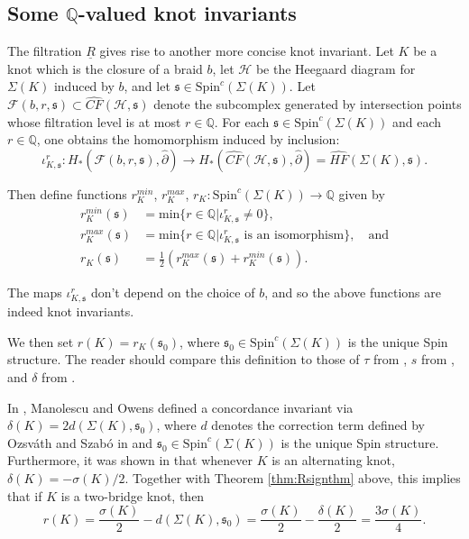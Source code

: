 \documentclass[11pt]{article}
\theoremstyle{plain} \newtheorem{thm}{Theorem}[subsection]
\theoremstyle{plain} \newtheorem{cor}[thm]{Corollary}
\theoremstyle{plain} \newtheorem{prop}[thm]{Proposition}
\theoremstyle{plain} \newtheorem{conj}[thm]{Conjecture}
\theoremstyle{plain} \newtheorem{lem}[thm]{Lemma}
\theoremstyle{definition} \newtheorem{df}[thm]{Definition}
\theoremstyle{remark} \newtheorem{rmk}[thm]{Remark}
\theoremstyle{remark} \newtheorem{obs}[thm]{Observation}
\newcommand{\DBC}[1]{\Sigma(#1)}
\newcommand{\h}{\mathcal{H}}
\newcommand{\del}{\partial}
\newcommand{\red}[1]{\underline{#1}}
\newcommand{\OS}{Ozsv\'ath and Szab\'o }
\numberwithin{equation}{section}
\begin{document}
\subsection{Some $\mathbb{Q}$-valued knot invariants}\label{sec:r}

The filtration $\red{R}$ gives rise to another more concise knot invariant.  Let $K$ be a knot which is the closure of a braid $b$, let $\h$ be the Heegaard diagram for $\DBC{K}$ induced by $b$, and let $\mathfrak{s} \in \text{Spin}^{c}(\DBC{K})$.  Let $\mathcal{F}(b,r, \mathfrak{s}) \subset \widehat{CF}(\h, \mathfrak{s})$ denote the subcomplex generated by intersection points whose filtration level is at most $r \in \mathbb{Q}$.  For each $\mathfrak{s} \in \text{Spin}^{c}(\DBC{K})$ and each $r \in \mathbb{Q}$, one obtains the homomorphism induced by inclusion:
$$ \iota^{r}_{K,\mathfrak{s}}: H_{*}(\mathcal{F}(b,r,\mathfrak{s}), \widehat{\del}) \rightarrow H_{*}(\widehat{CF}(\h, \mathfrak{s}), \widehat{\del}) = \widehat{HF}(\DBC{K},\mathfrak{s}).$$

Then define functions $r^{min}_{K}$, $r^{max}_{K}$, $r_{K}:\text{Spin}^{c}(\DBC{K}) \rightarrow \mathbb{Q}$ given by
\begin{align*}
r^{min}_{K}(\mathfrak{s}) &= \text{min}\{ r \in \mathbb{Q} |  \iota^{r}_{K,\mathfrak{s}}\neq 0\},\\
r^{max}_{K}(\mathfrak{s}) &= \text{min}\{ r \in \mathbb{Q} |  \iota^{r}_{K,\mathfrak{s}} \text{ is an isomorphism} \},
\quad \text{and}\\
r_{K}(\mathfrak{s}) &= \frac{1}{2}\left( r^{max}_{K}(\mathfrak{s}) + r^{min}_{K}(\mathfrak{s})\right).
\end{align*}

The maps $\iota^{r}_{K,\mathfrak{s}}$ don't depend on the choice of $b$, and so the above functions are indeed knot invariants.

We then set $r(K) = r_{K}(\mathfrak{s}_{0})$, where $\mathfrak{s}_{0} \in \text{Spin}^{c}(\DBC{K})$ is the unique Spin structure.  The reader should compare this definition to those of $\tau$ from \cite{os:4ball}, $s$ from \cite{ras:slice}, and $\delta$ from \cite{cmo:delta}.

In \cite{cmo:delta}, Manolescu and Owens defined a concordance invariant via $\delta(K) = 2 d(\DBC{K}, \mathfrak{s}_{0})$, where $d$ denotes the correction term defined by \OS in \cite{os:abs} and $\mathfrak{s}_{0} \in \text{Spin}^{c}(\DBC{K})$ is the unique Spin structure.  Furthermore, it was shown in \cite{cmo:delta} that whenever $K$ is an alternating knot, $\delta(K) = -\sigma(K)/2.$  Together with Theorem \ref{thm:Rsignthm} above, this implies that if $K$ is a two-bridge knot, then
$$ r(K)= \frac{\sigma(K)}{2} - d(\DBC{K}, \mathfrak{s}_{0}) = \frac{\sigma(K)}{2} - \frac{\delta(K)}{2} = \frac{3 \sigma(K)}{4}.$$
\end{document}
